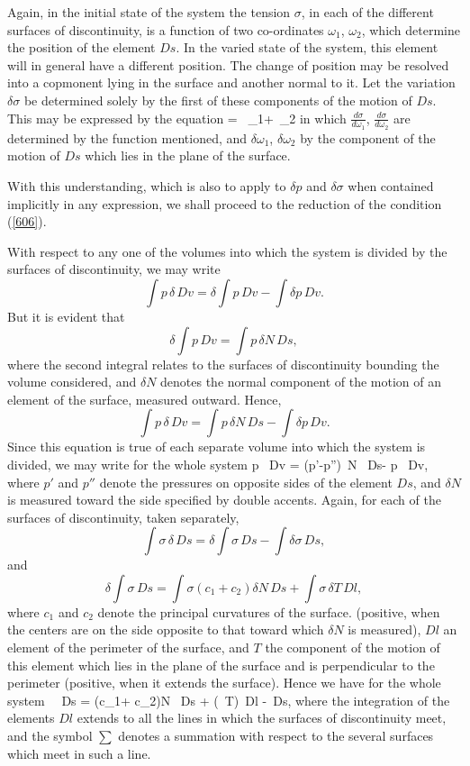 \documentclass[12pt]{article}
\newcommand{\dd}{\delta}
\begin{document}
Again, in the initial state of the system the tension $\sigma$, in each of the different surfaces of discontinuity, is a function of two co-ordinates $\omega_1$, $\omega_2$, which determine the position of the element $Ds$. In the varied state of the system, this element will in general have a different position. The change of position may be resolved into a copmonent lying in the surface and another normal to it. Let the variation $\dd \sigma$ be determined solely by the first of these components of the motion of $Ds$. This may be expressed by the equation
\eqs \dd \sigma= \, \dd \omega_1+\, \dd \omega_2   \label{608} \eqe
in which $\frac{d\sigma}{d\omega_1}$, $\frac{d\sigma}{d\omega_2}$ are determined by the function mentioned, and $\dd \omega_1$, $\dd \omega_2$ by the component of the motion of $Ds$ which lies in the plane of the surface.

With this understanding, which is also to apply to $\dd p$ and $\dd \sigma$ when contained implicitly in any expression, we shall proceed to the reduction of the condition (\ref{606}).

With respect to any one of the volumes into which the system is divided by the surfaces of discontinuity, we may write
$$ \int p \, \dd \, Dv = \dd \int p \, Dv- \int \dd p \, Dv. $$
But it is evident that
$$ \dd \int p \, Dv = \int p \, \dd N \, Ds, $$
where the second integral relates to the surfaces of discontinuity bounding the volume considered, and $\dd N$ denotes the normal component of the motion of an element of the surface, measured outward. Hence,
$$ \int p \, \dd \, Dv = \int p \, \dd N \, Ds -\int \dd p \, Dv. $$
Since this equation is true of each separate volume into which the system is divided, we may write for the whole system
\eqs \int p \, \dd Dv = \int(p'-p'')\, \dd N \, Ds- \int \dd p \, Dv, \label{609} \eqe
where $p'$ and $p''$ denote the pressures on opposite sides of the element $Ds$, and $\dd N$ is measured toward the side specified by double accents. Again, for each of the surfaces of discontinuity, taken separately,
$$ \int \sigma \, \dd \, Ds =  \dd \int \sigma \, Ds-\int \dd \sigma \, Ds, $$
and
$$ \dd \int \sigma \, Ds = \int \sigma (c_1+ c_2)\dd N \, Ds+ \int \sigma  \, \dd T \, Dl, $$
where $c_1$ and $c_2$ denote the principal curvatures of the surface. (positive, when the centers are on the side opposite to that toward which $\dd N$ is measured), $Dl$ an element of the perimeter of the surface, and $T$ the component of the motion of this element which lies in the plane of the surface and is perpendicular to the perimeter (positive, when it extends the surface). Hence we have for the whole system
\eqs \int \sigma \, \dd \, Ds = \int \sigma (c_1+ c_2)\dd N \, Ds + \int \sum(\sigma\, \dd T)\, Dl -\int \dd \sigma \, Ds,  \label{610} \eqe 
where the integration of the elements $Dl$ extends to all the lines in which the surfaces of discontinuity meet, and the symbol $\sum$ denotes a summation with respect to the several surfaces which meet in such a line.
\end{document}
